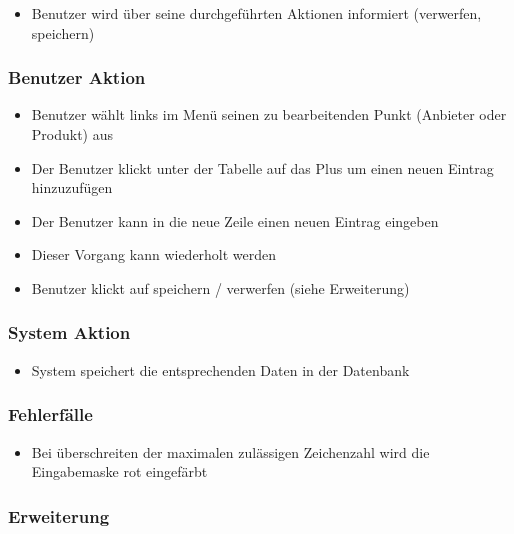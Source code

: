 \documentclass[a4paper,12pt]{article}
\begin{document}
\begin{itemize}

\item
  Benutzer wird über seine durchgeführten Aktionen informiert
  (verwerfen, speichern)
\end{itemize}

\subsubsection{Benutzer Aktion}\label{benutzer-aktion-8}

\begin{itemize}

\item
  Benutzer wählt links im Menü seinen zu bearbeitenden Punkt (Anbieter
  oder Produkt) aus
\item
  Der Benutzer klickt unter der Tabelle auf das Plus um einen neuen
  Eintrag hinzuzufügen
\item
  Der Benutzer kann in die neue Zeile einen neuen Eintrag eingeben
\item
  Dieser Vorgang kann wiederholt werden
\item
  Benutzer klickt auf speichern / verwerfen (siehe Erweiterung)
\end{itemize}

\subsubsection{System Aktion}\label{system-aktion-8}

\begin{itemize}

\item
  System speichert die entsprechenden Daten in der Datenbank
\end{itemize}

\subsubsection{Fehlerfälle}\label{fehlerfalle-8}

\begin{itemize}

\item
  Bei überschreiten der maximalen zulässigen Zeichenzahl wird die
  Eingabemaske rot eingefärbt
\end{itemize}

\subsubsection{Erweiterung}\label{erweiterung-8}
\end{document}
